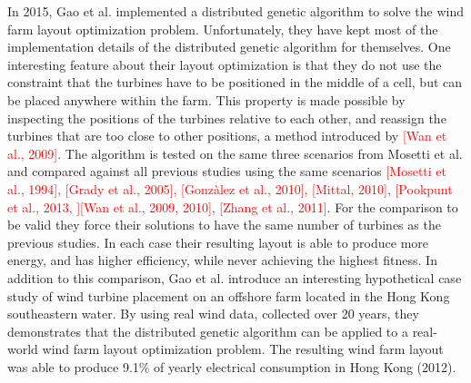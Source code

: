 \noindent In 2015, Gao et al. implemented a distributed genetic algorithm to solve the wind farm layout optimization problem. Unfortunately, they have kept most of the implementation details of the distributed genetic algorithm for themselves. One interesting feature about their layout optimization is that they do not use the constraint that the turbines have to be positioned in the middle of a cell, but can be placed anywhere within the farm. This property is made possible by inspecting the positions of the turbines relative to each other, and reassign the turbines that are too close to other positions, a method introduced by \textcolor{red}{[Wan et al., 2009]}. The algorithm is tested on the same three scenarios from Mosetti et al. and compared against all previous studies using the same scenarios \textcolor{red}{[Mosetti et al., 1994], [Grady et al., 2005], [Gonzàlez et al., 2010], [Mittal, 2010], [Pookpunt et al., 2013, ][Wan et al., 2009, 2010], [Zhang et al., 2011]}. For the comparison to be valid they force their solutions to have the same number of turbines as the previous studies. In each case their resulting layout is able to produce more energy, and has higher efficiency, while never achieving the highest fitness. In addition to this comparison, Gao et al. introduce an interesting hypothetical case study of wind turbine placement on an offshore farm located in the Hong Kong southeastern water. By using real wind data, collected over 20 years, they demonstrates that the distributed genetic algorithm can be applied to a real-world wind farm layout optimization problem. The resulting wind farm layout was able to produce 9.1\% of yearly electrical consumption in Hong Kong (2012).



